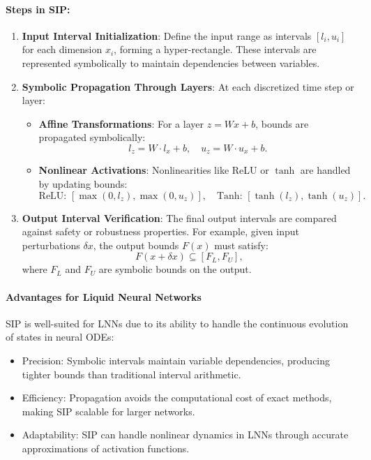 \paragraph{Steps in SIP:}
\begin{enumerate}
    \item \textbf{Input Interval Initialization}:
    Define the input range as intervals \([l_i, u_i]\) for each dimension \(x_i\), forming a hyper-rectangle. These intervals are represented symbolically to maintain dependencies between variables.
    
    \item \textbf{Symbolic Propagation Through Layers}:
    At each discretized time step or layer:
    \begin{itemize}
        \item \textbf{Affine Transformations}:
        For a layer \(z = W x + b\), bounds are propagated symbolically:
        \[
        l_z = W \cdot l_x + b, \quad u_z = W \cdot u_x + b.
        \]
        \item \textbf{Nonlinear Activations}:
        Nonlinearities like ReLU or \(\tanh\) are handled by updating bounds:
        \[
        \text{ReLU: } [\max(0, l_z), \max(0, u_z)], \quad
        \text{Tanh: } [\tanh(l_z), \tanh(u_z)].
        \]
    \end{itemize}
    
    \item \textbf{Output Interval Verification}:
    The final output intervals are compared against safety or robustness properties. For example, given input perturbations \(\delta x\), the output bounds \(F(x)\) must satisfy:
    \[
    F(x + \delta x) \subseteq [F_L, F_U],
    \]
    where \(F_L\) and \(F_U\) are symbolic bounds on the output.
\end{enumerate}

\paragraph{Advantages for Liquid Neural Networks}
SIP is well-suited for LNNs due to its ability to handle the continuous evolution of states in neural ODEs:
\begin{itemize}
    \item Precision: Symbolic intervals maintain variable dependencies, producing tighter bounds than traditional interval arithmetic.
    \item Efficiency: Propagation avoids the computational cost of exact methods, making SIP scalable for larger networks.
    \item Adaptability: SIP can handle nonlinear dynamics in LNNs through accurate approximations of activation functions.
\end{itemize}

